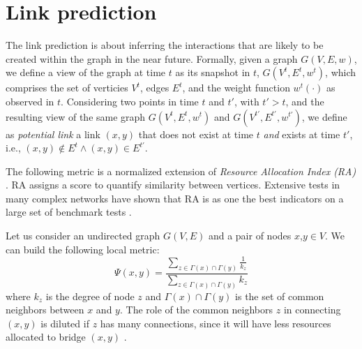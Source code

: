 \section{Link prediction}
\label{sec:link-prediction}

The link prediction is about inferring the interactions that are likely to be created within the graph in the near future. 
Formally, given a graph $G(V,E,w)$, we define a view of the graph at time $ t $ as its snapshot in $ t $, $G(V^t,E^t,w^t)$, which comprises the set of verticies $ V^t $, edges $ E^t $, and the weight function $ w^t(\cdot) $ as observed in $ t $.
%
Considering two points in time $t$ and $t'$, with $t'>t$, and the resulting view of the same graph $G(V^t,E^t,w^t)$ and $G(V^{t'},E^{t'},w^{t'})$, 
we define as \textit{potential link} a link $(x,y)$ that does not exist at time $ t $ \textit{and} exists at time $ t' $, i.e.,  $(x,y) \notin E^t \wedge (x,y) \in E^{t'} $. 


The following metric is a normalized extension of \textit{Resource Allocation Index (RA)} \cite{berlusconi2016link, Lu2011,zhou2009predicting}. RA assigns a score to quantify similarity between vertices. Extensive tests in many complex networks have shown that RA is as one the best indicators on a large set of benchmark tests  \cite{berlusconi2016link,Lu2011}.


Let us consider an undirected graph $G(V,E)$ and a pair of nodes $x$,$y\in V$. We can build the following local metric:
%
\begin{equation}
\label{eqn:prediction-local}
\Psi(x,y)=
\frac{\sum\limits_{z\in \Gamma(x) \cap \Gamma(y)}\frac{1}{k_{z}}}
{\sum\limits_{z\in \Gamma(x) \cap \Gamma(y)}k_{z}}
\end{equation}
%
where $k_{z}$ is the degree of node $z$ and $\Gamma(x) \cap \Gamma(y)$ is the set of common neighbors between $x$ and $y$. The role of the common neighbors $z$ in connecting $(x, y)$ is diluted if $z$ has many connections, since it will have less resources allocated to bridge $(x, y)$ \cite{berlusconi2016link}.


